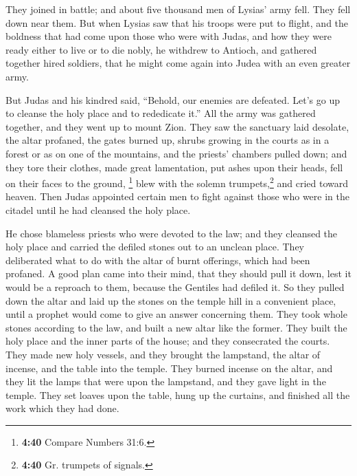  They joined in battle; and about five thousand men of
Lysias' army fell. They fell down near them.  But when
Lysias saw that his troops were put to flight, and the boldness that had
come upon those who were with Judas, and how they were ready either to
live or to die nobly, he withdrew to Antioch, and gathered together
hired soldiers, that he might come again into Judea with an even greater
army.

 But Judas and his kindred said, ``Behold, our enemies
are defeated. Let's go up to cleanse the holy place and to rededicate
it.''  All the army was gathered together, and they went
up to mount Zion.  They saw the sanctuary laid desolate,
the altar profaned, the gates burned up, shrubs growing in the courts as
in a forest or as on one of the mountains, and the priests' chambers
pulled down;  and they tore their clothes, made great
lamentation, put ashes upon their heads,  fell on their
faces to the ground, \footnote{\textbf{4:40} Compare Numbers 31:6.} blew
with the solemn trumpets,\footnote{\textbf{4:40} Gr. trumpets of
  signals.} and cried toward heaven.  Then Judas
appointed certain men to fight against those who were in the citadel
until he had cleansed the holy place.

 He chose blameless priests who were devoted to the law;
 and they cleansed the holy place and carried the defiled
stones out to an unclean place.  They deliberated what to
do with the altar of burnt offerings, which had been profaned.
 A good plan came into their mind, that they should pull
it down, lest it would be a reproach to them, because the Gentiles had
defiled it. So they pulled down the altar  and laid up
the stones on the temple hill in a convenient place, until a prophet
would come to give an answer concerning them.  They took
whole stones according to the law, and built a new altar like the
former.  They built the holy place and the inner parts of
the house; and they consecrated the courts.  They made
new holy vessels, and they brought the lampstand, the altar of incense,
and the table into the temple.  They burned incense on
the altar, and they lit the lamps that were upon the lampstand, and they
gave light in the temple.  They set loaves upon the
table, hung up the curtains, and finished all the work which they had
done.

